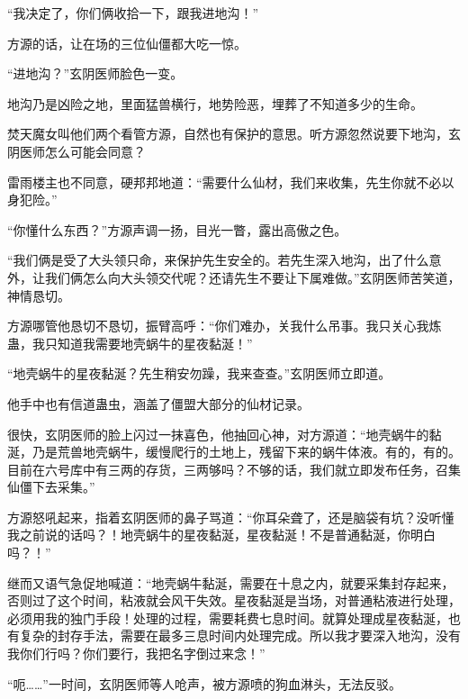 \begin{this_body}
“我决定了，你们俩收拾一下，跟我进地沟！”

方源的话，让在场的三位仙僵都大吃一惊。

“进地沟？”玄阴医师脸色一变。

地沟乃是凶险之地，里面猛兽横行，地势险恶，埋葬了不知道多少的生命。

焚天魔女叫他们两个看管方源，自然也有保护的意思。听方源忽然说要下地沟，玄阴医师怎么可能会同意？

雷雨楼主也不同意，硬邦邦地道：“需要什么仙材，我们来收集，先生你就不必以身犯险。”

“你懂什么东西？”方源声调一扬，目光一瞥，露出高傲之色。

“我们俩是受了大头领只命，来保护先生安全的。若先生深入地沟，出了什么意外，让我们俩怎么向大头领交代呢？还请先生不要让下属难做。”玄阴医师苦笑道，神情恳切。

方源哪管他恳切不恳切，振臂高呼：“你们难办，关我什么吊事。我只关心我炼蛊，我只知道我需要地壳蜗牛的星夜黏涎！”

“地壳蜗牛的星夜黏涎？先生稍安勿躁，我来查查。”玄阴医师立即道。

他手中也有信道蛊虫，涵盖了僵盟大部分的仙材记录。

很快，玄阴医师的脸上闪过一抹喜色，他抽回心神，对方源道：“地壳蜗牛的黏涎，乃是荒兽地壳蜗牛，缓慢爬行的土地上，残留下来的蜗牛体液。有的，有的。目前在六号库中有三两的存货，三两够吗？不够的话，我们就立即发布任务，召集仙僵下去采集。”

方源怒吼起来，指着玄阴医师的鼻子骂道：“你耳朵聋了，还是脑袋有坑？没听懂我之前说的话吗？！地壳蜗牛的星夜黏涎，星夜黏涎！不是普通黏涎，你明白吗？！”

继而又语气急促地喊道：“地壳蜗牛黏涎，需要在十息之内，就要采集封存起来，否则过了这个时间，粘液就会风干失效。星夜黏涎是当场，对普通粘液进行处理，必须用我的独门手段！处理的过程，需要耗费七息时间。就算处理成星夜黏涎，也有复杂的封存手法，需要在最多三息时间内处理完成。所以我才要深入地沟，没有我你们行吗？你们要行，我把名字倒过来念！”

“呃……”一时间，玄阴医师等人呛声，被方源喷的狗血淋头，无法反驳。

\end{this_body}

